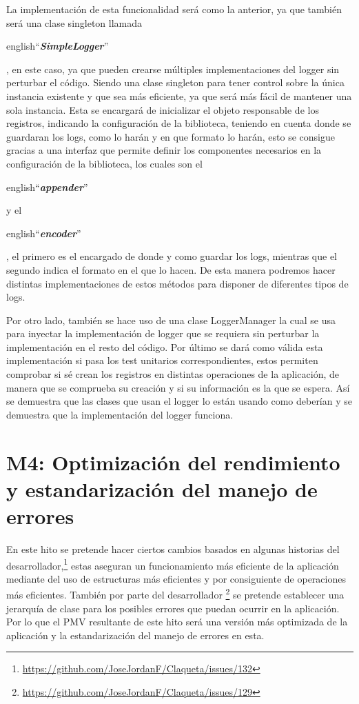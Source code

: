 La implementación de esta funcionalidad será como la anterior, ya que también será una clase singleton
\cite{DPatterns} llamada \begin{otherlanguage} {english}``\textit{\textbf{SimpleLogger}}''\end{otherlanguage}, 
en este caso, ya que pueden crearse múltiples implementaciones del logger sin perturbar el código. Siendo una clase 
singleton para tener control sobre la única instancia existente y que sea más eficiente, ya que será más fácil de 
mantener una sola instancia. Esta se encargará de inicializar el objeto responsable de los registros, indicando la 
configuración de la biblioteca, teniendo en cuenta donde se guardaran los logs, como lo harán y en que formato lo 
harán, esto se consigue gracias a una interfaz que permite definir los componentes necesarios en la configuración de 
la biblioteca, los cuales son el \begin{otherlanguage} {english}``\textit{\textbf{appender}}''\end{otherlanguage} y 
el \begin{otherlanguage} {english}``\textit{\textbf{encoder}}''\end{otherlanguage}, el primero es el encargado de 
donde y como guardar los logs, mientras que el segundo indica el formato en el que lo hacen. De esta manera podremos 
hacer distintas implementaciones de estos métodos para disponer de diferentes tipos de logs.

Por otro lado, también se hace uso de una clase LoggerManager la cual se usa para inyectar la implementación de 
logger que se requiera sin perturbar la implementación en el resto del código. Por último se dará como válida esta
implementación si pasa los test unitarios correspondientes, estos permiten comprobar si sé crean los registros en 
distintas operaciones de la aplicación, de manera que se comprueba su creación y si su información es la que se 
espera. Así se demuestra que las clases que usan el logger lo están usando como deberían y se demuestra que la 
implementación del logger funciona.

\section{M4: Optimización del rendimiento y estandarización del manejo de errores}

En este hito se pretende hacer ciertos cambios basados en algunas historias del 
desarrollador,\footnote{\url{https://github.com/JoseJordanF/Claqueta/issues/132}}
estas aseguran un funcionamiento más eficiente de la aplicación mediante del uso de estructuras más eficientes y por
consiguiente de operaciones más eficientes. También por parte del desarrollador 
\footnote{\url{https://github.com/JoseJordanF/Claqueta/issues/129}} se pretende establecer una jerarquía de clase 
para los posibles errores que puedan ocurrir en la aplicación. Por lo que el PMV resultante de este hito será una 
versión más optimizada de la aplicación y la estandarización del manejo de errores en esta.

